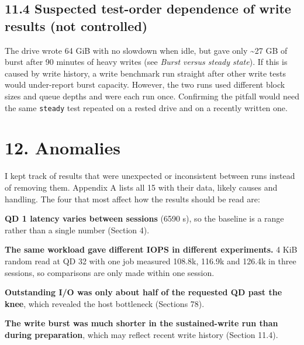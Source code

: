 \documentclass[10pt,letterpaper]{article}
\begin{document}
\subsection*{11.4 Suspected test-order dependence of write results (not controlled)}

The drive wrote 64 GiB with no slowdown when idle, but gave only \textasciitilde{}27 GB of burst after 90 minutes of heavy writes (see \emph{Burst versus steady state}). If this is caused by write history, a write benchmark run straight after other write tests would under-report burst capacity. However, the two runs used different block sizes and queue depths and were each run once. Confirming the pitfall would need the same \texttt{steady} test repeated on a rested drive and on a recently written one.


\section*{12. Anomalies}

I kept track of results that were unexpected or inconsistent between runs instead of removing them. Appendix A lists all 15 with their data, likely causes and handling. The four that most affect how the results should be read are:

\noindent \textbullet{} \textbf{QD 1 latency varies between sessions} (65\textendash{}90 \textmu{}s), so the baseline is a range rather than a single number (Section 4).\par\smallskip

\noindent \textbullet{} \textbf{The same workload gave different IOPS in different experiments.} 4 KiB random read at QD 32 with one job measured 108.8k, 116.9k and 126.4k in three sessions, so comparisons are only made within one session.\par\smallskip

\noindent \textbullet{} \textbf{Outstanding I/O was only about half of the requested QD past the knee}, which revealed the host bottleneck (Sections 7\textendash{}8).\par\smallskip

\noindent \textbullet{} \textbf{The write burst was much shorter in the sustained-write run than during preparation}, which may reflect recent write history (Section 11.4).\par\smallskip
\end{document}
